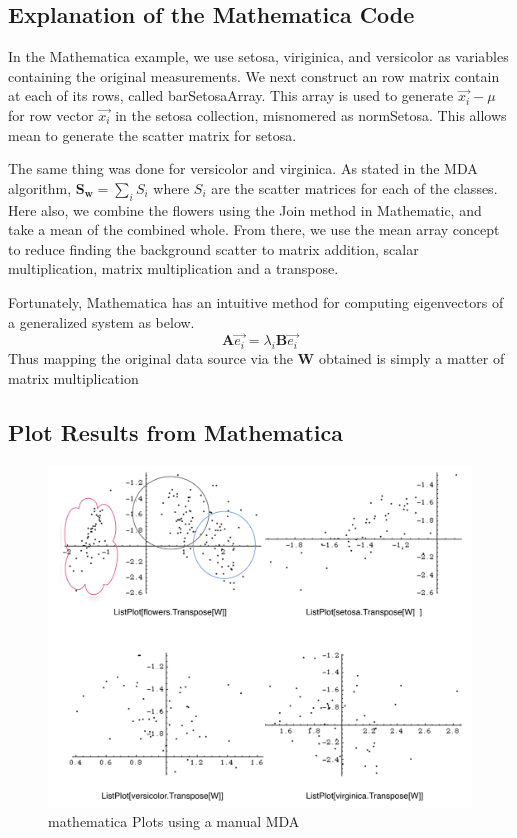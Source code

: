 \documentclass[11pt]{article}
\begin{document}
\subsection{Explanation of the Mathematica Code}
In the Mathematica example, we use setosa, viriginica, and versicolor as variables containing the original measurements.  We next construct an row matrix contain at each of its rows, called barSetosaArray.  This array is used to generate $\vec{x_i} - \mu$ for row vector $\vec{x_i}$ in the setosa collection, misnomered as normSetosa.  This allows mean to generate the scatter matrix for setosa.  

The same thing was done for versicolor and virginica.  As stated in the MDA algorithm, $\mathbf{S_w}=  \sum_i S_i$ where $S_i$ are the scatter matrices for each of the classes.  Here also, we combine the flowers using the Join method in Mathematic, and take a mean of the combined whole.  From there, we use the mean array concept to reduce finding the background scatter to matrix addition, scalar multiplication, matrix multiplication and a transpose.  

Fortunately, Mathematica has an intuitive method for computing eigenvectors of a generalized system as below.
\[
\mathbf{A} \vec{e_i} = \lambda_i \mathbf{B} \vec{e_i}
\]
Thus mapping the original data source via the $\mathbf{W}$ obtained is simply a matter of matrix multiplication

\subsection{Plot Results from Mathematica}
\begin{figure}[htbp] %
   \centering
   \includegraphics[width=5in]{flowersMDA.pdf} 
   \caption{mathematica Plots using a manual MDA}
   \label{mathematicaPlotsUsingManualMDA}
\end{figure}
\end{document}
